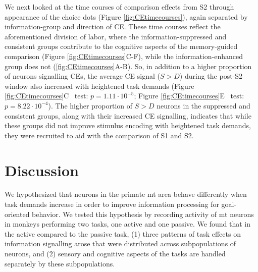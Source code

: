 We next looked at the time courses of comparison effects from S2 through appearance of the choice dots (Figure \ref{fig:CEtimecourses}), again separated by information-group and direction of CE. These time courses reflect the aforementioned division of labor, where the information-suppressed and consistent groups contribute to the cognitive aspects of the memory-guided comparison (Figure \ref{fig:CEtimecourses}C-F), while the information-enhanced group does not (\ref{fig:CEtimecourses}A-B). So, in addition to a higher proportion of neurons signalling CEs, the average CE signal ($S>D$) during the post-S2 window also increased with heightened task demands (Figure \ref{fig:CEtimecourses}C \kst\ test: $p=1.11 \cdot 10^{-5}$; Figure \ref{fig:CEtimecourses}E \kst\ test: $p=8.22 \cdot 10^{-4}$). The higher proportion of $S>D$ neurons in the suppressed and consistent groups, along with their increased CE signalling, indicates that while these groups did not improve stimulus encoding with heightened task demands, they were recruited to aid with the comparison of S1 and S2. 


\section*{Discussion}
\glsresetall
We hypothesized that neurons in the primate \gls{mt} area behave differently when task demands increase in order to improve information processing for goal-oriented behavior. We tested this hypothesis by recording activity of \gls{mt} neurons in monkeys performing two tasks, one active and one passive.
We found that in the active compared to the passive task, (1) three patterns of task effects on information signalling arose that were distributed across subpopulations of neurons, and (2) sensory and cognitive aspects of the tasks are handled separately by these subpopulations.


